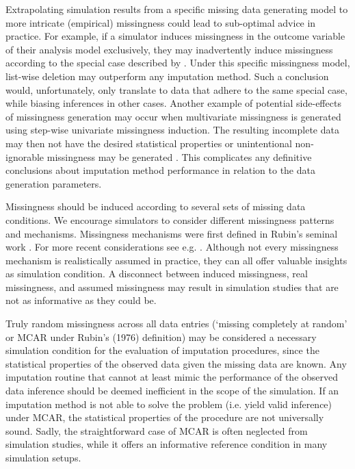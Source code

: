 \documentclass[bimj,fleqn]{w-art}
\begin{document}
Extrapolating simulation results from a specific missing data generating model to more intricate (empirical) missingness could lead to sub-optimal advice in practice. For example, if a simulator induces missingness in the outcome variable of their analysis model exclusively, they may inadvertently induce missingness according to the special case described by \citet[][\S 2.7]{buur18}. Under this specific missingness model, list-wise deletion may outperform any imputation method. Such a conclusion would, unfortunately, only translate to data that adhere to the same special case, while biasing inferences in other cases. %
Another example of potential side-effects of missingness generation may occur when multivariate missingness is generated using step-wise univariate missingness induction. The resulting incomplete data may then not have the desired statistical properties or unintentional non-ignorable missingness may be generated \citep{ampute, robins1997}. This complicates any definitive conclusions about imputation method performance in relation to the data generation parameters.

Missingness should be induced according to several sets of missing data conditions. We encourage simulators to consider different missingness patterns and mechanisms. Missingness mechanisms were first defined in Rubin's seminal work \citep{rubi76}. For more recent considerations see e.g. \citet{seam13, meal15, dore18, more18, scho18, litt20, moha21, scho21}. Although not every missingness mechanism is realistically assumed in practice, they can all offer valuable insights as simulation condition. A disconnect between induced missingness, real missingness, and assumed missingness may result in simulation studies that are not as informative as they could be.

Truly random missingness across all data entries (`missing completely at random' or MCAR under Rubin's (1976) \nocite{rubi76} definition) may be considered a necessary simulation condition for the evaluation of imputation procedures, since the statistical properties of the observed data given the missing data are known. Any imputation routine that cannot at least mimic the performance of the observed data inference should be deemed inefficient in the scope of the simulation. If an imputation method is not able to solve the problem (i.e. yield valid inference) under MCAR, the statistical properties of the procedure are not universally sound. Sadly, the straightforward case of MCAR is often neglected from simulation studies, while it offers an informative reference condition in many simulation setups.
\end{document}
